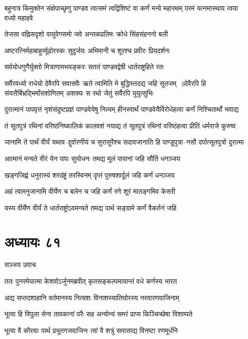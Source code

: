\threelineshloka
{बहुनात्र किमुक्तेन संक्षेपाच्छृणु पाण्डव}
{त्वत्समं त्वद्विशिष्टं वा कर्णं मन्ये महारथम्}
{परमं यत्नमास्थाय त्वया वध्यो महाहवे}


\twolineshloka
{तेजसा वह्निसदृशो वायुवेगसमो जवे}
{अन्तकप्रतिमः क्रोधे सिंहसंहननो बली}


\twolineshloka
{अष्टरत्निर्महाबाहुर्व्यूढोरस्कः सुदुर्जयः}
{अभिमानी च शूरश्च प्रवीरः प्रियदर्शनः}


\twolineshloka
{सर्वयोधगुणैर्युक्तो मित्राणामभयङ्करः}
{सततं पाण्डवद्वेषी धार्तराष्ट्रहिते रतः}


\threelineshloka
{सर्वैरवध्यो राधेयो देवैरपि सवासवैः}
{ऋते त्वामिति मे बुद्धिस्तदद्य जहि सूतजम् ॥देवैरपि हि संयत्तैर्बिभ्रद्भिर्मांसशोणितम्}
{अशक्यः स रथो जेतुं सर्वैरपि युयुत्सुभिः}


\twolineshloka
{दुरात्मानं पापवृत्तं नृशंसंदुष्टप्रज्ञं पाण्डवेयेषु नित्यम्}
{हीनस्वार्थं पाण्डवेयैर्विरोधेहत्वा कर्णं निश्चितार्थो भवाद्य}


\twolineshloka
{तं सूतपुत्रं रथिनां वरिष्ठंनिष्कालिकं कालवशं नयाद्य}
{तं सूतपुत्रं रथिनां वरिष्ठंहत्वा प्रीतिं धर्मराजे कुरुष्व}


\twolineshloka
{जानामि ते पार्थं वीर्यं यथाव--द्दुर्वारणीयं च सुरासुरैश्च}
{सदावजानाति हि पाण्डुपुत्रा--नसौ दर्पात्सूतपुत्रो दुरात्मा}


\twolineshloka
{आत्मानं मन्यते वीरं येन पापः सुयोधनः}
{तमद्य मूलं पापानां जहि सौतिं धनञ्जय}


\twolineshloka
{खङ्गजिह्वं धनुरास्यं शरदंष्ट्रं तरस्विनम्}
{दृप्तं पुरुषशार्दूलं जहि कर्णं धनञ्जय}


\twolineshloka
{अहं त्वामनुजानामि वीर्येण च बलेन च}
{जहि कर्णं रणे शूरं मातङ्गमिव केसरी}


\twolineshloka
{यस्य वीर्येण वीर्यं ते धार्तराष्ट्रोऽवमन्यते}
{तमद्य पार्थ सङ्ग्रामे कर्णं वैकर्तनं जहि}


\chapter{अध्यायः ८१}
\twolineshloka
{सञ्जय उवाच}
{}


\twolineshloka
{ततः पुनरमेयात्मा केशवोऽर्जुनमब्रवीत्}
{कृतसङ्कल्पमायान्तं वधे कर्णस्य भारत}


\twolineshloka
{अद्य सप्तदशाहानि वर्तमानस्य नित्यशः}
{विनाशस्यातिघोरस्य नरवारणवाजिनाम्}


\twolineshloka
{भूत्वा हि विपुला सेना तावकानां परैः सह}
{अन्योन्यं समरं प्राप्य किञ्चिच्छेषा विशाम्पते}


\twolineshloka
{भूत्वा वै कौरवाः पार्थ प्रभूतगजवाजिनः}
{त्वां वै शत्रुं समासाद्य विनष्टा रणमूर्धनि}


